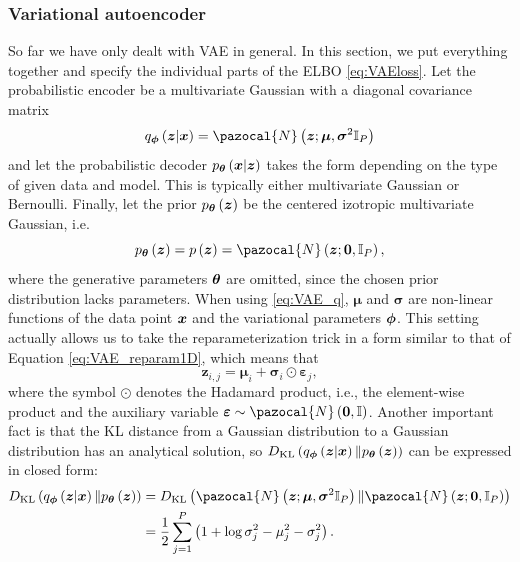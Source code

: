 \subsubsection{Variational autoencoder}
So far we have only dealt with VAE in general. In this section, we put everything together and specify the individual parts of the ELBO \eqref{eq:VAEloss}.
Let the probabilistic encoder be a multivariate Gaussian with a diagonal covariance matrix
\begin{equation}\label{eq:VAE_q}
q_{\bphi}\left(\boldsymbol{z}\vert \bx \right) = \pazocal{N}\left(\boldsymbol{z}; \boldsymbol{\mu},\boldsymbol{\sigma}^2\mathbb{I}_P  \right) 
\end{equation}
and let the probabilistic decoder $p_{\boldsymbol{\theta}}\left(\boldsymbol{x}\vert\boldsymbol{z}\right)$ takes the form depending on the type of given data and model. This is typically either multivariate Gaussian or Bernoulli. Finally, let the prior $p_{\boldsymbol{\theta}}\left(\boldsymbol{z}\right)$ be the centered izotropic multivariate Gaussian, i.e.
\begin{equation}
p_{\bt}\left(\boldsymbol{z} \right) = p\left(\boldsymbol{z} \right) = \pazocal{N}\left(\boldsymbol{z}; \boldsymbol{0},\mathbb{I}_P  \right),
\end{equation}
where the generative parameters $\boldsymbol{\theta}$ are omitted, since the chosen prior distribution lacks parameters. When using \eqref{eq:VAE_q}, $\boldsymbol{\mu}$ and $\boldsymbol{\sigma}$ are non-linear functions of the data point $\boldsymbol{x}$ and the variational parameters $\boldsymbol{\phi}$. This setting actually allows us to take the reparameterization trick in a form similar to that of Equation \eqref{eq:VAE_reparam1D}, which means that
\begin{equation}\label{eq:reparam_specific}
\boldsymbol{z}_{i,j} = \boldsymbol{\mu}_i + \boldsymbol{\sigma}_i\odot\boldsymbol{\varepsilon}_j ,
\end{equation}
where the symbol $\odot$ denotes the Hadamard product, i.e., the element-wise product and the auxiliary variable $\boldsymbol{\varepsilon} \sim \pazocal{N}\left(\boldsymbol{0},\mathbb{I} \right)$.
Another important fact is that the KL distance from a Gaussian distribution to a Gaussian distribution has an analytical solution, so $D_{\mathrm{KL}} \left(q_{\boldsymbol{\phi}}\left(\boldsymbol{z}\vert \boldsymbol{x} \right) \Vert p_{\boldsymbol{\theta}}\left(\boldsymbol{z}\right) \right)$ can be expressed in closed form:
\begin{equation}
\begin{split}
 \KL{q_{\bphi}\left(\bz\vert \bx \right)}{p_{\bt}\left(\bz\right)} & = \KL{\pazocal{N}\left(\boldsymbol{z}; \boldsymbol{\mu},\boldsymbol{\sigma}^2\mathbb{I}_P  \right) }{\pazocal{N}\left(\boldsymbol{z}; \boldsymbol{0},\mathbb{I}_P  \right)}\\ & =\frac{1}{2}\sum_{j=1}^P\left(1 + \log\sigma^2_j -\mu_j^2 -\sigma_j^2 \right).
\end{split}
\end{equation}
